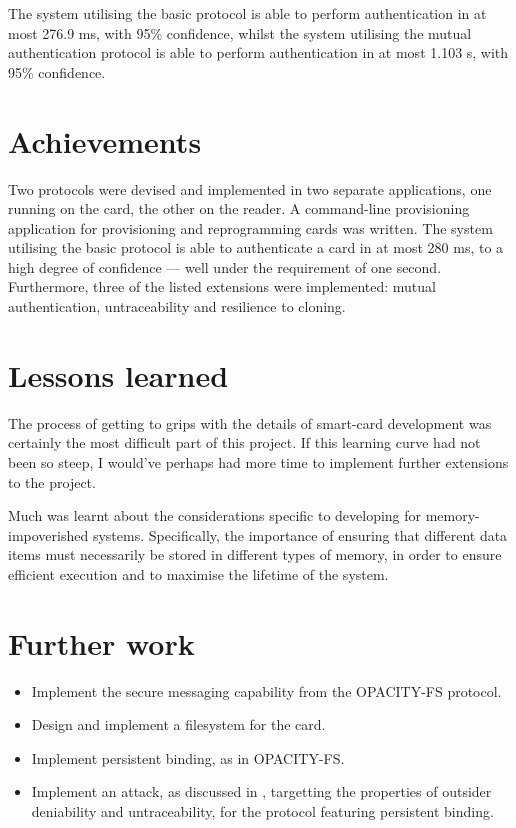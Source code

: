 \documentclass[12pt,a4paper,twoside,openright]{report}
\begin{document}
The system utilising the basic protocol is able to perform authentication in at most 276.9 ms, with 95\% confidence, whilst the system utilising the mutual authentication protocol is able to perform authentication in at most 1.103 s, with 95\% confidence.

\section{Achievements}

Two protocols were devised and implemented in two separate applications, one running on the card, the other on the reader. A command-line provisioning application for provisioning and reprogramming cards was written. The system utilising the basic protocol is able to authenticate a card in at most 280 ms, to a high degree of confidence --- well under the requirement of one second. Furthermore, three of the listed extensions were implemented: mutual authentication, untraceability and resilience to cloning.

\section{Lessons learned}

The process of getting to grips with the details of smart-card development was certainly the most difficult part of this project. If this learning curve had not been so steep, I would've perhaps had more time to implement further extensions to the project.

Much was learnt about the considerations specific to developing for memory-impoverished systems. Specifically, the importance of ensuring that different data items must necessarily be stored in different types of memory, in order to ensure efficient execution and to maximise the lifetime of the system.

\section{Further work}

\begin{itemize}
\item Implement the secure messaging capability from the OPACITY-FS protocol.
\item Design and implement a filesystem for the card.
\item Implement persistent binding, as in OPACITY-FS.
\item Implement an attack, as discussed in \cite{opacityanalysis}, targetting the properties of outsider deniability and untraceability, for the protocol featuring persistent binding.
\end{itemize}
\end{document}
